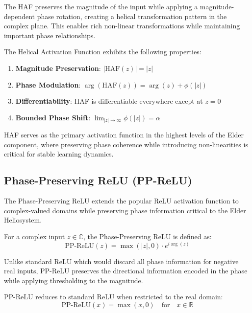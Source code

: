 The HAF preserves the magnitude of the input while applying a magnitude-dependent phase rotation, creating a helical transformation pattern in the complex plane. This enables rich non-linear transformations while maintaining important phase relationships.

\begin{theorem}
The Helical Activation Function exhibits the following properties:
\begin{enumerate}
    \item \textbf{Magnitude Preservation}: $|\text{HAF}(z)| = |z|$
    \item \textbf{Phase Modulation}: $\arg(\text{HAF}(z)) = \arg(z) + \phi(|z|)$
    \item \textbf{Differentiability}: HAF is differentiable everywhere except at $z=0$
    \item \textbf{Bounded Phase Shift}: $\lim_{|z| \to \infty} \phi(|z|) = \alpha$
\end{enumerate}
\end{theorem}

HAF serves as the primary activation function in the highest levels of the Elder component, where preserving phase coherence while introducing non-linearities is critical for stable learning dynamics.

\subsection{Phase-Preserving ReLU (PP-ReLU)}

The Phase-Preserving ReLU extends the popular ReLU activation function to complex-valued domains while preserving phase information critical to the Elder Heliosystem.

\begin{definition}
For a complex input $z \in \mathbb{C}$, the Phase-Preserving ReLU is defined as:
\begin{equation}
\text{PP-ReLU}(z) = \max(|z|, 0) \cdot e^{i\arg(z)}
\end{equation}
\end{definition}

Unlike standard ReLU which would discard all phase information for negative real inputs, PP-ReLU preserves the directional information encoded in the phase while applying thresholding to the magnitude.

\begin{observation}
PP-ReLU reduces to standard ReLU when restricted to the real domain:
\begin{equation}
\text{PP-ReLU}(x) = \max(x, 0) \quad \text{for} \quad x \in \mathbb{R}
\end{equation}
\end{observation}

